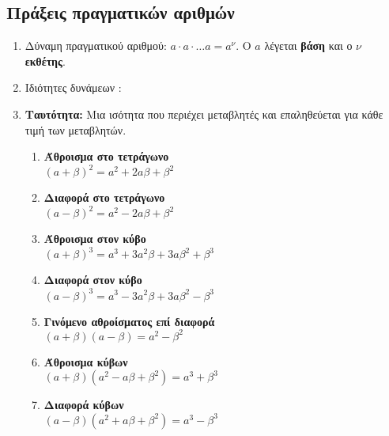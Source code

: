 \documentclass[a4paper,11pt]{article}
\begin{document}
\subsection{Πράξεις πραγματικών αριθμών}
\begin{enumerate}
\item Δύναμη πραγματικού αριθμού: $ a\cdot a\cdot\ldots a=a^\nu $. Ο $ a $ λέγεται \textbf{βάση} και ο $ \nu $ \textbf{εκθέτης}.
\item Ιδιότητες δυνάμεων : 
\begin{multicols}{3}
\end{multicols}
\item \textbf{Ταυτότητα:} Μια ισότητα που περιέχει μεταβλητές και επαληθεύεται για κάθε τιμή των μεταβλητών.
\begin{multicols}{2}
\begin{enumerate}[itemsep=0mm,label=\bf\arabic*.]
\item \parbox[t]{7cm}{\textbf{Άθροισμα στο τετράγωνο}\\$ (a+\beta)^2=a^2+2a\beta+\beta^2 $}
\item \parbox[t]{7cm}{\textbf{Διαφορά στο τετράγωνο}\\$ (a-\beta)^2=a^2-2a\beta+\beta^2 $}
\item \parbox[t]{7cm}{\textbf{Άθροισμα στον κύβο}\\$ (a+\beta)^3=a^3+3a^2\beta+3a\beta^2+\beta^3 $}
\item \parbox[t]{7cm}{\textbf{Διαφορά στον κύβο}\\$ (a-\beta)^3=a^3-3a^2\beta+3a\beta^2-\beta^3 $}
\item \parbox[t]{7cm}{\textbf{Γινόμενο αθροίσματος επί διαφορά}\\$ (a+\beta)(a-\beta)=a^2-\beta^2 $}
\item \parbox[t]{7cm}{\textbf{Άθροισμα κύβων}\\$ (a+\beta)\left(a^2-a\beta+\beta^2 \right)=a^3+\beta^3 $}
\item \parbox[t]{7cm}{\textbf{Διαφορά κύβων}\\$ (a-\beta)\left(a^2+a\beta+\beta^2 \right)=a^3-\beta^3 $}
\end{enumerate}
\end{multicols}
\end{enumerate}
\end{document}
